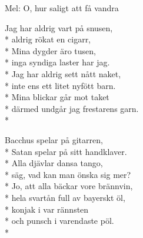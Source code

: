 \begin{SongText}
    \begin{SongInfo}
        Mel: O, hur saligt att få vandra
    \end{SongInfo}
    \begin{SongVerse}
        Jag har aldrig vart på snusen,\\*%
        aldrig rökat en cigarr,\\*%
        Mina dygder äro tusen,\\*%
        inga syndiga laster har jag.\\*%
        Jag har aldrig sett nått naket,\\*%
        inte ens ett litet nyfött barn.\\*%
        Mina blickar går mot taket\\*%
        därmed undgår jag frestarens garn.\\*%
    \end{SongVerse}
    \begin{SongVerse}
        Bacchus spelar på gitarren,\\*%
        Satan spelar på sitt handklaver.\\*%
        Alla djävlar dansa tango,\\*%
        säg, vad kan man önska sig mer?\\*%
        Jo, att alla bäckar vore brännvin,\\*%
        hela svartån full av bayerskt öl,\\*%
        konjak i var rännsten\\*%
        och punsch i varendaste pöl.\\*%
    \end{SongVerse}
\end{SongText}

